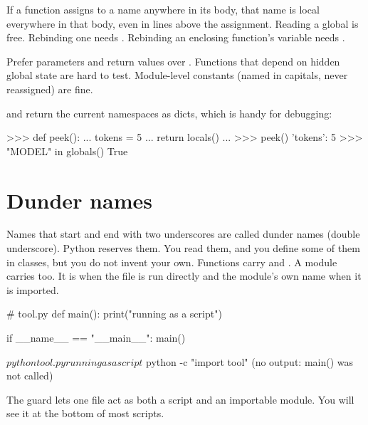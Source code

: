\begin{trap}
If a function assigns to a name anywhere in its body, that name is local everywhere in that body,
even in lines above the assignment. Reading a global is free. Rebinding one needs
. Rebinding an enclosing function's variable needs .
\end{trap}

\begin{gamerule}
Prefer parameters and return values over . Functions that depend on hidden global
state are hard to test. Module-level constants (named in capitals, never reassigned) are fine.
\end{gamerule}

 and  return the current namespaces as dicts, which is handy for
debugging:

\begin{pycode}
>>> def peek():
...     tokens = 5
...     return locals()
...
>>> peek()
{'tokens': 5}
>>> "MODEL" in globals()
True
\end{pycode}

\section{Dunder names}

Names that start and end with two underscores are called dunder names (double underscore).
Python reserves them. You read them, and you define some of them in classes, but you do not
invent your own. Functions carry  and . A module carries
 too. It is  when the file is run directly and the
module's own name when it is imported.

\begin{pycode}
# tool.py
def main():
    print("running as a script")

if __name__ == "__main__":
    main()
\end{pycode}
\begin{rawcode}
$ python tool.py
running as a script

$ python -c "import tool"
(no output: main() was not called)
\end{rawcode}

The  guard lets one file act as both a script and an
importable module. You will see it at the bottom of most scripts.

